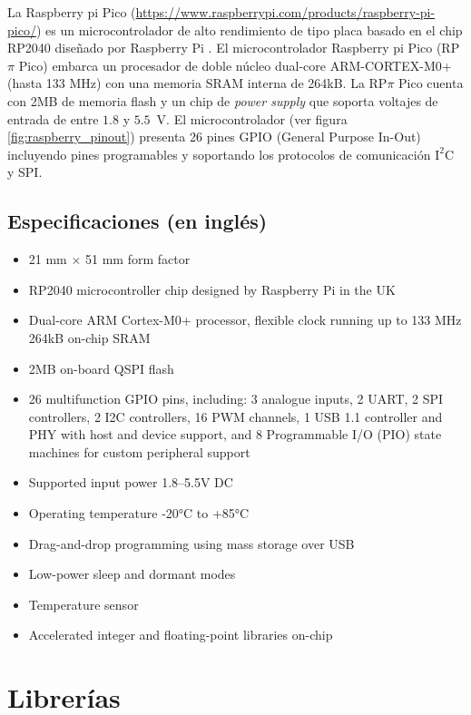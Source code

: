 \documentclass[a4paper,12pt]{book}
\begin{document}
La Raspberry pi Pico (\url{https://www.raspberrypi.com/products/raspberry-pi-pico/}) es un microcontrolador de alto rendimiento de tipo placa basado en el chip RP2040 diseñado por Raspberry Pi \cite{raspberrypiPico-datasheet}. El microcontrolador Raspberry pi Pico (RP$\pi$ Pico) embarca un procesador de doble núcleo dual-core ARM-CORTEX-M0+ (hasta 133 MHz) con una memoria SRAM interna de  264kB. La RP$\pi$ Pico cuenta con 2MB de memoria flash y un chip de \emph{power supply} que soporta voltajes de entrada de entre $1.8$ y $5.5$~V. El microcontrolador (ver figura \ref{fig:raspberry_pinout}) presenta 26 pines GPIO (General Purpose In-Out) incluyendo pines programables y soportando los protocolos de comunicación $\mathrm{I^2C}$ y SPI.

\subsection{Especificaciones (en inglés)}

\begin{itemize}
    \item 21 mm $\times$ 51 mm form factor
    \item RP2040 microcontroller chip designed by Raspberry Pi in the UK
    \item Dual-core ARM Cortex-M0+ processor, flexible clock running up to 133 MHz 264kB on-chip SRAM
    \item 2MB on-board QSPI flash
    \item 26 multifunction GPIO pins, including: 3 analogue inputs, 2 UART, 2 SPI controllers, 2 I2C controllers, 16 PWM channels, 1 USB 1.1 controller and PHY with host and device support, and 8 Programmable I/O (PIO) state machines for custom peripheral support
    \item Supported input power 1.8–5.5V DC
    \item Operating temperature -20°C to +85°C
    \item Drag-and-drop programming using mass storage over USB
    \item Low-power sleep and dormant modes
    \item Temperature sensor
    \item Accelerated integer and floating-point libraries on-chip
\end{itemize}




\section{Librerías}
\end{document}
